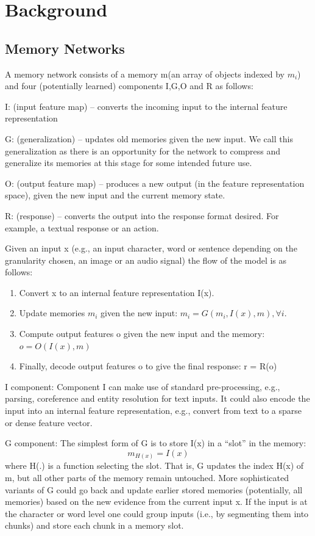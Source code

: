 \documentclass{article}
\begin{document}
\section{Background}

\subsection{Memory Networks}

A memory network consists of a memory m(an array of objects indexed by $m_i$) and four (potentially learned) components I,G,O and R as follows:

I:  (input feature map) – converts the incoming input to the internal feature representation

G:  (generalization) – updates old memories given the new input.  We call this generalization as there is an opportunity for the network to compress and generalize its memories at this stage for some intended future use.

O: (output feature map) – produces a new output (in the feature representation space), given the new input and the current memory state.

R:  (response) – converts the output into the response format desired.  For example, a textual response or an action.

Given an input x (e.g., an input character, word or sentence depending on the granularity chosen, an
image or an audio signal) the flow of the model is as follows:

\begin{enumerate}
  \item Convert x to an internal feature representation I(x). 
  \item Update memories $m_i$ given the new input:
$ m_i = G(m_i, I(x),m), \forall i.$
  \item Compute output features o given the new input and the memory: $ o = O( I(x),m)$
  \item Finally, decode output features o to give the final response: r = R(o)
\end{enumerate}

I component: Component I can make use of standard pre-processing, e.g., parsing, coreference and entity resolution for text inputs. It could also encode the input into an internal feature representation, e.g., convert from text to a sparse or dense feature vector.

G component: The simplest form of G is to store I(x) in a “slot” in the memory:
\begin{equation}
m_{H(x)} = I(x)
\end{equation}
where H(.) is a function selecting the slot.  That is, G updates the index H(x) of m, but all other
parts of the memory remain untouched. More sophisticated variants of G could go back and update earlier stored memories (potentially, all memories) based on the new evidence from the current input x. If the input is at the character or word level one could group inputs (i.e., by segmenting them into chunks) and store each chunk in a memory slot.
\end{document}

